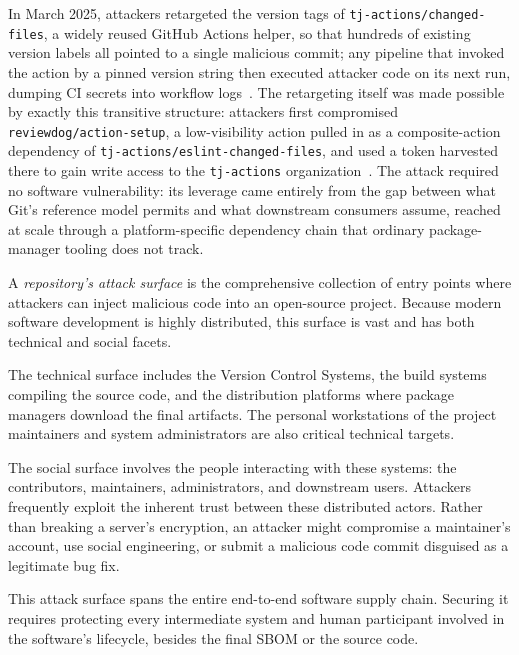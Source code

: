 In March 2025, attackers retargeted the version tags of \texttt{tj-actions/changed-files}, a widely reused GitHub Actions helper, so that hundreds of existing version labels all pointed to a single malicious commit; any pipeline that invoked the action by a pinned version string then executed attacker code on its next run, dumping CI secrets into workflow logs~\cite{paloalto_unit42_2025}.
The retargeting itself was made possible by exactly this transitive structure: attackers first compromised \texttt{reviewdog/action-setup}, a low-visibility action pulled in as a composite-action dependency of \texttt{tj-actions/eslint-changed-files}, and used a token harvested there to gain write access to the \texttt{tj-actions} organization~\cite{paloalto_unit42_2025}.
The attack required no software vulnerability: its leverage came entirely from the gap between what Git's reference model permits and what downstream consumers assume, reached at scale through a platform-specific dependency chain that ordinary package-manager tooling does not track.

A \emph{repository's attack surface} is the comprehensive collection of entry points where attackers can inject malicious code into an open-source project.
Because modern software development is highly distributed, this surface is vast and has both technical and social facets.

The technical surface includes the Version Control Systems, the build systems compiling the source code, and the distribution platforms where package managers download the final artifacts.
The personal workstations of the project maintainers and system administrators are also critical technical targets.

The social surface involves the people interacting with these systems: the contributors, maintainers, administrators, and downstream users.
Attackers frequently exploit the inherent trust between these distributed actors.
Rather than breaking a server's encryption, an attacker might compromise a maintainer's account, use social engineering, or submit a malicious code commit disguised as a legitimate bug fix.

This attack surface spans the entire end-to-end software supply chain.
Securing it requires protecting every intermediate system and human participant involved in the software's lifecycle, besides the final SBOM or the source code.

